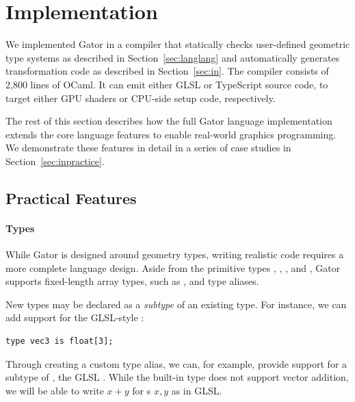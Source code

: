 \documentclass[../main.tex]{subfiles}
\begin{document}
\section{Implementation}
\label{sec:practice}

We implemented Gator in a compiler that statically checks user-defined geometric type systems as described in Section~\ref{sec:langlang} and automatically generates transformation code as described in Section~\ref{sec:in}.
The compiler consists of 2,800 lines of OCaml.
It can emit either GLSL or TypeScript source code, to target either GPU shaders or CPU-side setup code, respectively.

The rest of this section describes how the full Gator language implementation extends the core language features to enable real-world graphics programming.
We demonstrate these features in detail in a series of case studies in Section~\ref{sec:inpractice}.

\subsection{Practical Features}
\label{sec:target}
\paragraph{Types}

While Gator is designed around geometry types, writing realistic code requires a more complete language design.
Aside from the primitive types , , , and , Gator supports fixed-length array types, such as , and type aliases.

New types may be declared as a \emph{subtype} of an existing type.
For instance, we can add support for the GLSL-style :
%
\begin{lstlisting}
type vec3 is float[3];
\end{lstlisting}
%
Through creating a custom type alias, we can, for example, provide support for a subtype of , the GLSL .
While the built-in  type does not support vector addition, we will be able to write $x+y$ for s $x,y$ as in GLSL.
\end{document}

